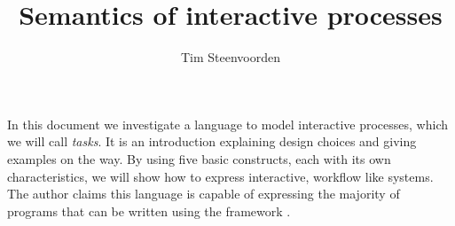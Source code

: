\documentclass
  [a4paper
  ,justified
  ,nofonts
  ]{tufte-handout}
\title{Semantics of interactive processes}
\author{Tim Steenvoorden}
\begin{document}
\maketitle


In this document we investigate a language to model interactive processes,
which we will call \emph{tasks}.
It is an introduction explaining design choices and giving examples on the way.
By using five basic constructs,
each with its own characteristics,
we will show how to express interactive, workflow like systems.
The author claims this language is capable of expressing the majority of programs that can be written using the \ITASKS framework \cite{conf/pepm/PlasmeijerAKLNG11}.


\tableofcontents
\newpage









% 




\end{document}
